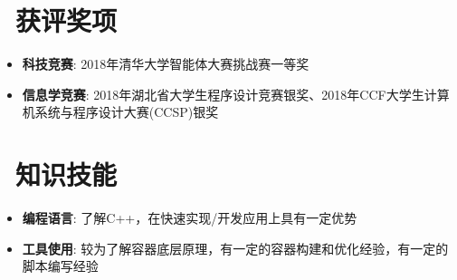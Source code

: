 \documentclass[utf8,letterpaper,11pt]{ctexart}
\newcommand{\resumeItem}[2]{
  \item\small{
    \textbf{#1}{: #2 \vspace{-2pt}}
  }
}
\newcommand{\resumeSubItem}[2]{\resumeItem{#1}{#2}\vspace{-4pt}}
\newcommand{\resumeSubHeadingListStart}{\begin{itemize}[leftmargin=*]}
\newcommand{\resumeSubHeadingListEnd}{\end{itemize}}
\begin{document}
\section{\faAward \ 获评奖项}
  \resumeSubHeadingListStart
    \resumeSubItem{科技竞赛}
    {2018年清华大学智能体大赛挑战赛一等奖}
    \resumeSubItem{信息学竞赛}
    {2018年湖北省大学生程序设计竞赛银奖、2018年CCF大学生计算机系统与程序设计大赛(CCSP)银奖}
  \resumeSubHeadingListEnd
\vspace{1pt}
\section{\faCog \ 知识技能}
  \resumeSubHeadingListStart
    \resumeSubItem{编程语言}
    {了解C++，在快速实现/开发应用上具有一定优势}
    \resumeSubItem{工具使用}
    {较为了解容器底层原理，有一定的容器构建和优化经验，有一定的脚本编写经验}
  \resumeSubHeadingListEnd
\end{document}
